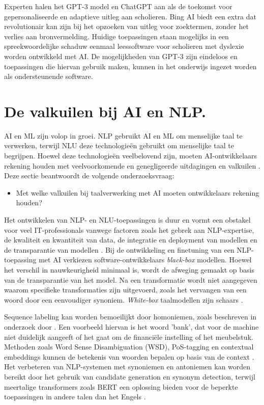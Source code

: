 \medspace

Experten halen het GPT-3 model en ChatGPT aan als de toekomst voor gepersonaliseerde en adaptieve uitleg aan scholieren. Bing AI biedt een extra dat revolutionair kan zijn bij het opzoeken van uitleg voor zoektermen, zonder het verlies aan bronvermelding. Huidige toepassingen staan mogelijks in een spreekwoordelijke schaduw eenmaal leessoftware voor scholieren met dyslexie worden ontwikkeld met AI. De mogelijkheden van GPT-3 zijn eindeloos en toepassingen die hiervan gebruik maken, kunnen in het onderwijs ingezet worden als ondersteunende software.



\section{De valkuilen bij AI en NLP.}

AI en ML zijn volop in groei. NLP gebruikt AI en ML om menselijke taal te verwerken, terwijl NLU deze technologieën gebruikt om menselijke taal te begrijpen. Hoewel deze technologieën veelbelovend zijn, moeten AI-ontwikkelaars rekening houden met veelvoorkomende en genegligeerde uitdagingen en valkuilen \autocite{Sciforce2020, Roldos2020, Khurana2022}. Deze sectie beantwoordt de volgende onderzoeksvraag: 

\begin{itemize}
	\item Met welke valkuilen bij taalverwerking met AI moeten ontwikkelaars rekening houden?
\end{itemize}

\medspace

Het ontwikkelen van NLP- en NLU-toepassingen is duur en vormt een obstakel voor veel IT-professionals vanwege factoren zoals het gebrek aan NLP-expertise, de kwaliteit en kwantiteit van data, de integratie en deployment van modellen en de transparantie van modellen \autocite{IBM2022}. Bij de ontwikkeling en finetuning van een NLP-toepassing met AI verkiezen software-ontwikkelaars \textit{black-box} modellen. Hoewel het verschil in nauwkeurigheid minimaal is, wordt de afweging gemaakt op basis van de transparantie van het model. Na een transformatie wordt niet aangegeven waarom specifieke transformaties zijn uitgevoerd, zoals het vervangen van een woord door een eenvoudiger synoniem. \textit{White-box} taalmodellen zijn schaars \autocite{Punardeep2020}.

\medspace 

Sequence labeling kan worden bemoeilijkt door homoniemen, zoals beschreven in onderzoek door \textcite{Roldos2020}. Een voorbeeld hiervan is het woord 'bank', dat voor de machine niet duidelijk aangeeft of het gaat om de financiële instelling of het meubelstuk. Methoden zoals Word Sense Disambiguation (WSD), PoS-tagging en contextual embeddings kunnen de betekenis van woorden bepalen op basis van de context \autocite{Eisenstein2019, Liu2020}. Het verbeteren van NLP-systemen met synoniemen en antoniemen kan worden bereikt door het gebruik van candidate generation en synonym detection, terwijl meertalige transformers zoals BERT een oplossing bieden voor de beperkte toepassingen in andere talen dan het Engels \autocite{Dandekar2016, Roldos2020}.

